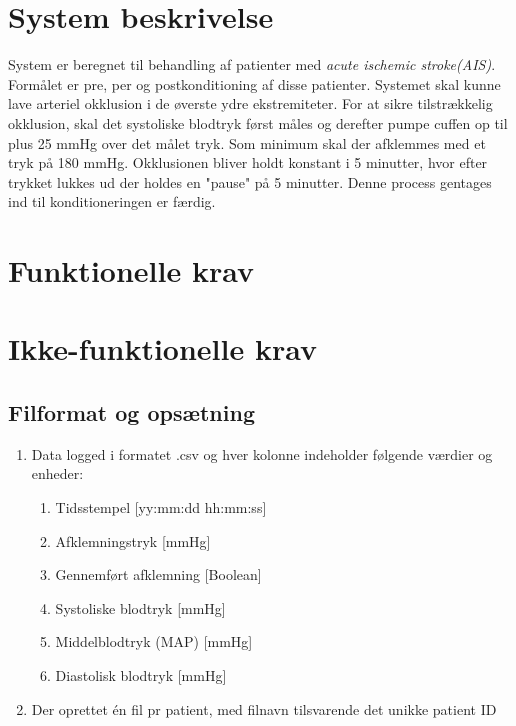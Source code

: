 \documentclass[11pt]{article}
\begin{document}
	\section{System beskrivelse}
	System er beregnet til behandling af patienter med \textit{acute ischemic stroke(AIS)}. Formålet er pre, per og postkonditioning af disse patienter. Systemet skal kunne lave arteriel okklusion i de øverste ydre ekstremiteter. For at sikre tilstrækkelig okklusion, skal det systoliske blodtryk først måles og derefter pumpe cuffen op til plus 25 mmHg over det målet tryk. Som minimum skal der afklemmes med et tryk på 180 mmHg. Okklusionen bliver holdt konstant i 5 minutter, hvor efter trykket lukkes ud der holdes en "pause" på 5 minutter. Denne process gentages ind til konditioneringen er færdig. 

	\section{Funktionelle krav}
	
	
	
	
	
	
	
	
	
	
	
	
	
	
	
	
	
	\section{Ikke-funktionelle krav }
	
	\subsection{Filformat og opsætning}
	\begin{enumerate}
		\setlength\itemsep{0cm} %
		\item Data logged i formatet .csv og hver kolonne indeholder følgende værdier og enheder: 
		\begin{enumerate}
			\item Tidsstempel [yy:mm:dd hh:mm:ss]
			\item Afklemningstryk [mmHg]
			\item Gennemført afklemning [Boolean]
			\item Systoliske blodtryk [mmHg]
			\item Middelblodtryk (MAP) [mmHg]
			\item Diastolisk blodtryk [mmHg]
		\end{enumerate}
		\item Der oprettet én fil pr patient, med filnavn tilsvarende det unikke patient ID
	\end{enumerate}
	
\end{document}
